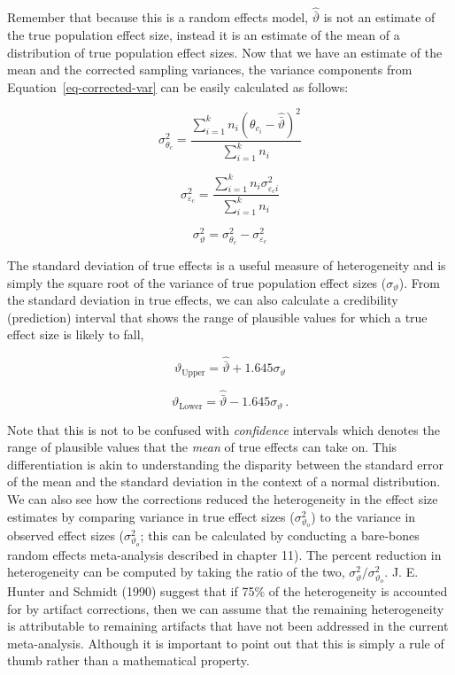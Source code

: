 \documentclass[
  letterpaper,
  DIV=11,
  numbers=noendperiod]{scrreprt}
\begin{document}
Remember that because this is a random effects model,
\(\hat{\bar{\vartheta}}\) is not an estimate of the true population
effect size, instead it is an estimate of the mean of a distribution of
true population effect sizes. Now that we have an estimate of the mean
and the corrected sampling variances, the variance components from
Equation~\ref{eq-corrected-var} can be easily calculated as follows:

\[
\sigma^2_{\theta_c} = \frac{\sum^k_{i=1}n_i(\theta_{c_i} - \hat{\bar{\vartheta}})^2}{\sum^k_{i=1}n_i}
\]

\[
\sigma^2_{\varepsilon_c} = \frac{\sum^k_{i=1}n_i\sigma^2_{\varepsilon_c i}}{\sum^k_{i=1}n_i}
\]

\[
\sigma^2_{\vartheta}  = \sigma^2_{\theta_c} - \sigma^2_{\varepsilon_c}
\]

The standard deviation of true effects is a useful measure of
heterogeneity and is simply the square root of the variance of true
population effect sizes (\(\sigma_{\vartheta}\)). From the standard
deviation in true effects, we can also calculate a credibility
(prediction) interval that shows the range of plausible values for which
a true effect size is likely to fall,

\[
\vartheta_{\text{Upper}} = \hat{\bar{\vartheta}} + 1.645\sigma_\vartheta
\]

\[
\vartheta_{\text{Lower}} = \hat{\bar{\vartheta}} - 1.645\sigma_\vartheta\, .
\]

Note that this is not to be confused with \emph{confidence} intervals
which denotes the range of plausible values that the \emph{mean} of true
effects can take on. This differentiation is akin to understanding the
disparity between the standard error of the mean and the standard
deviation in the context of a normal distribution. We can also see how
the corrections reduced the heterogeneity in the effect size estimates
by comparing variance in true effect sizes (\(\sigma^2_{\vartheta_o}\))
to the variance in observed effect sizes (\(\sigma^2_{\vartheta_o}\);
this can be calculated by conducting a bare-bones random effects
meta-analysis described in chapter 11). The percent reduction in
heterogeneity can be computed by taking the ratio of the two,
\(\sigma^2_{\vartheta}/\sigma^2_{\vartheta_o}\). J. E. Hunter and
Schmidt (1990) suggest that if 75\% of the heterogeneity is accounted
for by artifact corrections, then we can assume that the remaining
heterogeneity is attributable to remaining artifacts that have not been
addressed in the current meta-analysis. Although it is important to
point out that this is simply a rule of thumb rather than a mathematical
property.
\end{document}
